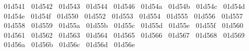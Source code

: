 {  ^^^^^^01d541%
  ^^^^^^01d542%
  ^^^^^^01d543%
  ^^^^^^01d544%
  ^^^^^^01d546%
  ^^^^^^01d54a%
  ^^^^^^01d54b%
  ^^^^^^01d54c%
  ^^^^^^01d54d%
  ^^^^^^01d54e%
  ^^^^^^01d54f%
  ^^^^^^01d550%
  ^^^^^^01d552%
  ^^^^^^01d553%
  ^^^^^^01d554%
  ^^^^^^01d555%
  ^^^^^^01d556%
  ^^^^^^01d557%
  ^^^^^^01d558%
  ^^^^^^01d559%
  ^^^^^^01d55a%
  ^^^^^^01d55b%
  ^^^^^^01d55c%
  ^^^^^^01d55d%
  ^^^^^^01d55e%
  ^^^^^^01d55f%
  ^^^^^^01d560%
  ^^^^^^01d561%
  ^^^^^^01d562%
  ^^^^^^01d563%
  ^^^^^^01d564%
  ^^^^^^01d565%
  ^^^^^^01d566%
  ^^^^^^01d567%
  ^^^^^^01d568%
  ^^^^^^01d569%
  ^^^^^^01d56a%
  ^^^^^^01d56b%
  ^^^^^^01d56c%
  ^^^^^^01d56d%
  ^^^^^^01d56e%
}
